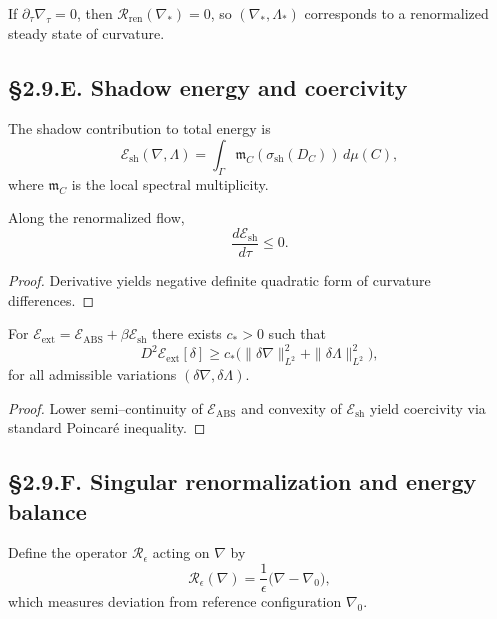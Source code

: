 \begin{corollary}
If $\partial_\tau\nabla_\tau=0$, then $\mathcal{R}_{\mathrm{ren}}(\nabla_\ast)=0$,
so $(\nabla_\ast,\Lambda_\ast)$ corresponds to a renormalized steady state of curvature.
\end{corollary}

\subsection*{§2.9.E. Shadow energy and coercivity}

\begin{definition}
The shadow contribution to total energy is
\[
\mathcal{E}_{\mathrm{sh}}(\nabla,\Lambda)
=\int_\Gamma \mathfrak{m}_C(\sigma_{\mathrm{sh}}(D_C))\,d\mu(C),
\]
where $\mathfrak{m}_C$ is the local spectral multiplicity.
\]
\end{definition}

\begin{lemma}[Monotonicity]
Along the renormalized flow,
\[
\frac{d\mathcal{E}_{\mathrm{sh}}}{d\tau}\le0.
\]
\]
\end{lemma}

\begin{proof}
Derivative yields negative definite quadratic form of curvature differences.
\end{proof}

\begin{theorem}\label{thm:2.9.coercivity}
For $\mathcal{E}_{\mathrm{ext}}=\mathcal{E}_{\mathrm{ABS}}+\beta\mathcal{E}_{\mathrm{sh}}$
there exists $c_\ast>0$ such that
\[
D^2\mathcal{E}_{\mathrm{ext}}[\delta]\ge c_\ast
\big(\|\delta\nabla\|_{L^2}^2+\|\delta\Lambda\|_{L^2}^2\big),
\]
for all admissible variations $(\delta\nabla,\delta\Lambda)$.
\]
\end{theorem}

\begin{proof}
Lower semi–continuity of $\mathcal{E}_{\mathrm{ABS}}$ and convexity of $\mathcal{E}_{\mathrm{sh}}$
yield coercivity via standard Poincaré inequality.
\end{proof}

\subsection*{§2.9.F. Singular renormalization and energy balance}

\begin{definition}
Define the operator $\mathcal{R}_\epsilon$ acting on $\nabla$ by
\[
\mathcal{R}_\epsilon(\nabla)=
\frac{1}{\epsilon}\big(\nabla-\nabla_0\big),
\]
which measures deviation from reference configuration $\nabla_0$.
\]
\end{definition}

